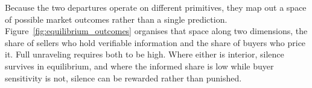 Because the two departures operate on different primitives, they map out a space of possible
market outcomes rather than a single prediction. Figure~\ref{fig:equilibrium_outcomes} organises
that space along two dimensions, the share of sellers who hold verifiable information and the
share of buyers who price it. Full unraveling requires both to be high. Where either is
interior, silence survives in equilibrium, and where the informed share is low while buyer
sensitivity is not, silence can be rewarded rather than punished.
